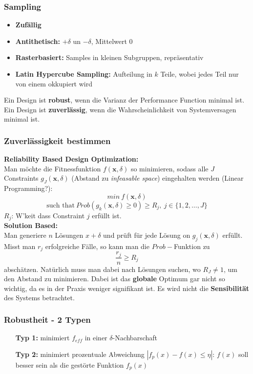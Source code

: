 \documentclass[a4paper]{article}
\begin{document}
\subsubsection{Sampling}
\begin{itemize}
	\item \textbf{Zufällig}
	\item \textbf{Antithetisch:} $+\delta$ un $-\delta$, Mittelwert 0
	\item \textbf{Rasterbasiert:} Samples in kleinen Subgruppen, repräsentativ
	\item \textbf{Latin Hypercube Sampling:} Aufteilung in $k$ Teile, wobei jedes Teil nur von einem okkupiert wird
\end{itemize}

Ein Design ist \textbf{robust}, wenn die Varianz der Performance Function minimal ist.\\
Ein Design ist \textbf{zuverlässig}, wenn die Wahrscheinlichkeit von Systemversagen minimal ist.\\

\subsubsection{Zuverlässigkeit bestimmen}
\textbf{Reliability Based Design Optimization:}\\
Man möchte die Fitnessfunktion $f(\mathbf{x},\delta)$ so minimieren, sodass alle $J$ Constraints
$g_J(\mathbf{x},\delta)$ (Abstand zu \textit{infeasable space}) eingehalten werden (Linear Programming?):
$$min \ f(\mathbf{x},\delta)$$
$$\text{such that} \ Prob(g_k(\mathbf{x},\delta)\geq 0) \geq R_j, \ j\in\{1,2,\dots, J\}$$
$R_j$: W'keit dass Constraint $j$ erfüllt ist.\\

\textbf{Solution Based:}\\
Man generiere $n$ Lösungen $x+\delta$ und prüft für jede Lösung on $g_j(\mathbf{x},\delta)$ erfüllt. Misst man $r_j$ erfolgreiche Fälle, so kann man die $Prob-$Funktion zu
$$\dfrac{r_j}{n}\geq R_j$$
abschätzen. Natürlich muss man dabei nach Lösungen suchen, wo $R_J \not = 1$, um den Abstand zu minimieren.
Dabei ist das \textbf{globale} Optimum gar nicht so wichtig, da es in der Praxis weniger signifikant ist. Es wird nicht die \textbf{Sensibilität} des Systems betrachtet. 

\subsubsection{Robustheit - 2 Typen}
\begin{itemize}
	\item[\textbf{Typ 1:}] minimiert $f_{eff}$ in einer $\delta$-Nachbarschaft
	\item[\textbf{Typ 2:}] minimiert prozentuale Abweichung $|f_p(x)-f(x)\leq \eta|$: $f(x)$ soll besser sein als die gestörte Funktion $f_p(x)$ 
\end{itemize}
\end{document}
